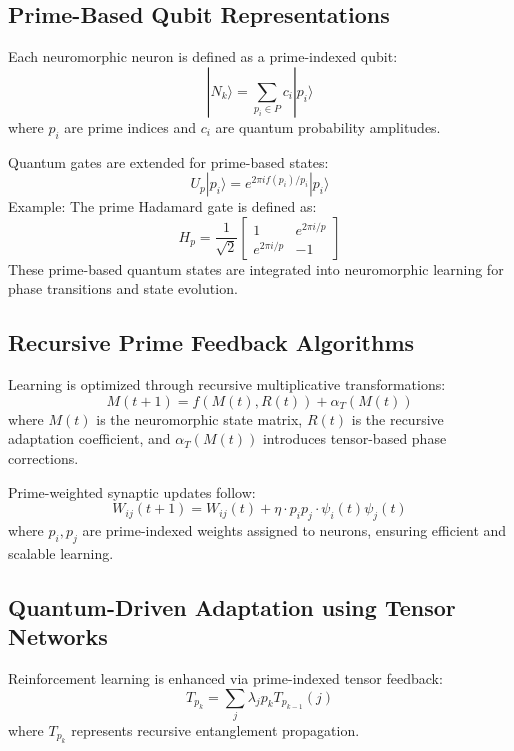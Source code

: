 \documentclass{article}
\theoremstyle{plain}
\begin{document}
\subsection{Prime-Based Qubit Representations}
Each neuromorphic neuron is defined as a prime-indexed qubit:
\begin{equation}
|N_k\rangle = \sum_{p_i \in P} c_i |p_i\rangle
\end{equation}
where $p_i$ are prime indices and $c_i$ are quantum probability amplitudes.

Quantum gates are extended for prime-based states:
\begin{equation}
U_p |p_i\rangle = e^{2\pi i f(p_i) / p_i} |p_i\rangle
\end{equation}
Example: The prime Hadamard gate is defined as:
\begin{equation}
H_p = \frac{1}{\sqrt{2}} \begin{bmatrix} 1 & e^{2\pi i/p} \\ e^{2\pi i/p} & -1 \end{bmatrix}
\end{equation}
These prime-based quantum states are integrated into neuromorphic learning for phase transitions and state evolution.

\subsection{Recursive Prime Feedback Algorithms}
Learning is optimized through recursive multiplicative transformations:
\begin{equation}
M(t+1) = f(M(t), R(t)) + \alpha_T(M(t))
\end{equation}
where $M(t)$ is the neuromorphic state matrix, $R(t)$ is the recursive adaptation coefficient, and $\alpha_T(M(t))$ introduces tensor-based phase corrections.

Prime-weighted synaptic updates follow:
\begin{equation}
W_{ij}(t+1) = W_{ij}(t) + \eta \cdot p_i p_j \cdot \psi_i(t) \psi_j(t)
\end{equation}
where $p_i, p_j$ are prime-indexed weights assigned to neurons, ensuring efficient and scalable learning.

\subsection{Quantum-Driven Adaptation using Tensor Networks}
Reinforcement learning is enhanced via prime-indexed tensor feedback:
\begin{equation}
T_{p_k} = \sum_{j} \lambda_j p_k T_{p_{k-1}}(j)
\end{equation}
where $T_{p_k}$ represents recursive entanglement propagation.
\end{document}
